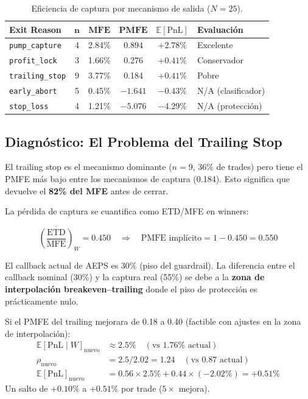\documentclass[11pt,a4paper]{article}
\newcommand{\E}{\mathbb{E}}
\begin{document}
\begin{table}[H]
\centering
\caption{Eficiencia de captura por mecanismo de salida ($N=25$).}
\label{tab:pmfe}
\begin{tabular}{lccccl}
\toprule
\textbf{Exit Reason} & $\bm{n}$ & $\overline{\textbf{MFE}}$ &
  $\overline{\textbf{PMFE}}$ & \textbf{$\E[\text{PnL}]$} & \textbf{Evaluaci\'on} \\
\midrule
\texttt{pump\_capture} & 4 & 2.84\% & $\bm{0.894}$ & $+2.78\%$ & Excelente \\
\texttt{profit\_lock} & 3 & 1.66\% & 0.276 & $+0.41\%$ & Conservador \\
\texttt{trailing\_stop} & 9 & 3.77\% & 0.184 & $+0.41\%$ & \textcolor{cred}{Pobre} \\
\texttt{early\_abort} & 5 & 0.45\% & $-1.641$ & $-0.43\%$ & N/A (clasificador) \\
\texttt{stop\_loss} & 4 & 1.21\% & $-5.076$ & $-4.29\%$ & N/A (protecci\'on) \\
\bottomrule
\end{tabular}
\end{table}

\subsection{Diagn\'ostico: El Problema del Trailing Stop}

El trailing stop es el mecanismo dominante ($n=9$, 36\% de trades)
pero tiene el PMFE m\'as bajo entre los mecanismos de captura
(0.184). Esto significa que devuelve el \textbf{82\% del MFE}
antes de cerrar.

La p\'erdida de captura se cuantifica como ETD/MFE en winners:

\begin{equation}
\overline{\left(\frac{\text{ETD}}{\text{MFE}}\right)}_W = 0.450
\quad \Rightarrow \quad
\text{PMFE impl\'icito} = 1 - 0.450 = 0.550
\end{equation}

El callback actual de AEPS es 30\% (piso del guardrail). La
diferencia entre el callback nominal (30\%) y la captura real
(55\%) se debe a la \textbf{zona de interpolaci\'on breakeven--trailing}
donde el piso de protecci\'on es pr\'acticamente nulo.

\begin{tcolorbox}[warnbox, title=Oportunidad de Mejora Cuantificada]
Si el PMFE del trailing mejorara de 0.18 a 0.40 (factible
con ajustes en la zona de interpolaci\'on):
\begin{align}
\E[\text{PnL} \mid W]_{\text{nuevo}} &\approx 2.5\% \quad (\text{vs } 1.76\% \text{ actual}) \\
\rho_{\text{nuevo}} &= 2.5 / 2.02 = 1.24 \quad (\text{vs } 0.87 \text{ actual}) \\
\E[\text{PnL}]_{\text{nuevo}} &= 0.56 \times 2.5\% + 0.44 \times (-2.02\%) = +0.51\%
\end{align}
Un salto de $+0.10\%$ a $+0.51\%$ por trade ($5\times$ mejora).
\end{tcolorbox}
\end{document}
